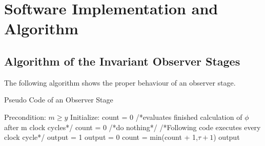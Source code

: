
\chapter{Software Implementation and Algorithm}
\label{chapter:2}


\section{Algorithm of the Invariant Observer Stages}
\label{chapter:sub:1}
The following algorithm shows the proper behaviour of an observer stage.\newline

\begin{algorithm}
\caption{Pseudo Code of an Observer Stage}
\label{alg:observerstage}
\begin{algorithmic}[1]
\REQUIRE Precondition: $m \ge y$
\STATE Initialize: count = 0
 \STATE  /*evaluates finished calculation of $\phi$ after m clock cycles*/
 \STATE  count = 0 
 \ELSE
  \STATE /*do nothing*/ 
 \ENDIF
\ENDIF 
\STATE /*Following code executes every clock cycle*/
 \STATE output = 1
\ELSE
 \STATE output = 0
\ENDIF
\STATE count = min(count + 1,$\tau + 1$)
\RETURN output
\end{algorithmic}
\end{algorithm}

